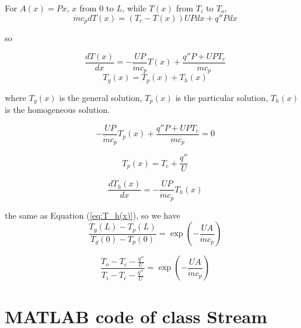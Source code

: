 For $A(x)=Px$, $x$ from $0$ to $L$, while $T(x)$ from $T_{i}$ to $T_{o}$,
\begin{equation}
\dot{m}c_{p}dT(x)=(T_{c}-T(x))UPdx+q''Pdx
\end{equation}

so

\begin{equation}
\frac{dT(x)}{dx}=-\frac{UP}{\dot{m}c_{p}}T(x)+\frac{q''P+UPT_{c}}{\dot{m}c_{p}}
\end{equation}
\begin{equation}
T_{g}(x)=T_{p}(x)+T_{h}(x)
\end{equation}

where $T_{g}(x)$ is the general solution, $T_{p}(x)$ is the particular
solution, $T_{h}(x)$ is the homogeneous solution.

\begin{equation}
-\frac{UP}{\dot{m}c_{p}}T_{p}(x)+\frac{q''P+UPT_{c}}{\dot{m}c_{p}}=0
\end{equation}

\begin{equation}
T_{p}(x)=T_{c}+\frac{q''}{U}
\end{equation}

\begin{equation}
\frac{dT_{h}(x)}{dx}=-\frac{UP}{\dot{m}c_{p}}T_{h}(x)
\end{equation}

the same as Equation (\ref{eq:T_h(x)}), so we have
\begin{equation}
\frac{T_{g}(L)-T_{p}(L)}{T_{g}(0)-T_{p}(0)}=\exp(-\frac{UA}{\dot{m}c_{p}})
\end{equation}

\begin{equation}
\frac{T_{o}-T_{c}-\frac{q''}{U}}{T_{i}-T_{c}-\frac{q''}{U}}=\exp(-\frac{UA}{\dot{m}c_{p}})
\end{equation}

\chapter{MATLAB code of class Stream}
\label{cha:MATLAB_SOURCECODE}


